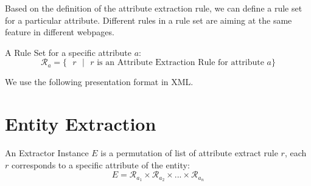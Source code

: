 \begin{table}[htb!]
\small
\centering
\caption{Pre-defined Actions in Attributes Extraction}
\label{tab:actions}
\vspace{-1em}
\end{table}

Based on the definition of the attribute extraction rule, we can define a rule set for a particular attribute. Different rules in a rule set are aiming at the same feature in different webpages.
\begin{defn}
A Rule Set for a specific attribute $a$:
\begin{equation}
	\mathcal{R}_a = \lbrace \text{ $r$ $\vert$ $r$ is an Attribute Extraction Rule for attribute $a$}  \rbrace
\end{equation}
\end{defn}

We use the following presentation format in XML.


\section{Entity Extraction}
\begin{defn}
An Extractor Instance $E$ is a permutation of list of attribute extract rule $r$, each $r$ corresponds to a specific attribute of the entity:
	\begin{equation}
		E = \mathcal{R}_{a_1} \times \mathcal{R}_{a_2} \times ... \times \mathcal{R}_{a_n}
	\end{equation}
\end{defn}

